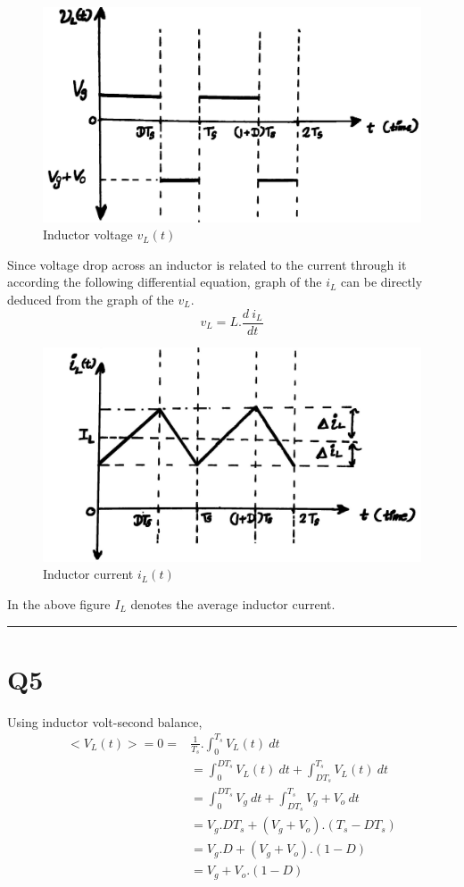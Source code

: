\documentclass[a4paper,11pt]{article}%
\begin{document}
\begin{figure}[!h]
	\centering
	\includegraphics[scale=0.15]{figures/vl}
	\caption{Inductor voltage $v_L(t)$}	
\end{figure}
\pagebreak
Since voltage drop across an inductor is related to the current through it according the following differential equation, graph of the $i_L$ can be directly deduced from the graph of the $v_L$.
\[v_L = L.\frac{d~i_L}{dt}\]

\begin{figure}[!h]
	\centering
	\includegraphics[scale=0.15]{figures/il}	
	\caption{Inductor current $i_L(t)$}
\end{figure}

In the above figure $I_L$ denotes the average inductor current.\\

\hrule
\section*{Q5}
Using inductor volt-second balance,
\[
\begin{split}
	<V_L(t)> = 0 = & \frac{1}{T_s}.\int_{0}^{T_s} V_L(t) ~dt\\
	&=\int_{0}^{DT_s} V_L(t) ~dt + \int_{DT_s}^{T_s}V_L(t) ~dt\\
	&=\int_{0}^{DT_s} V_g  ~dt + \int_{DT_s}^{T_s} V_g + V_o ~dt\\
	&= V_g.DT_s +(V_g + V_o).(T_s - DT_s)\\
	&= V_g.D +(V_g + V_o).(1 - D)\\
	&= V_g + V_o.(1 - D) 
\end{split}
\]
\end{document}
